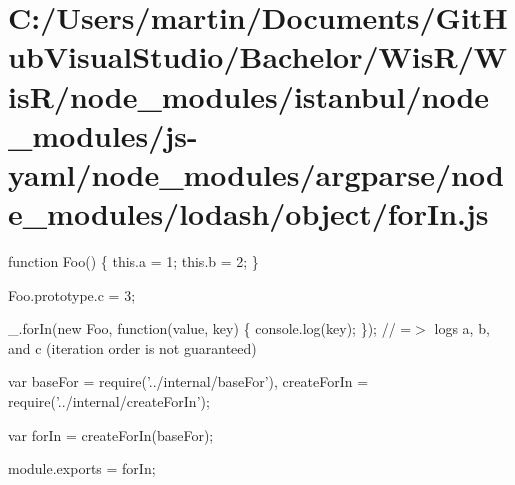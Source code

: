 \hypertarget{_c_1_2_users_2martin_2_documents_2_git_hub_visual_studio_2_bachelor_2_wis_r_2_wis_r_2node_module9ffc97169f0a15e2134f146445cd7404}{}\section{C\+:/\+Users/martin/\+Documents/\+Git\+Hub\+Visual\+Studio/\+Bachelor/\+Wis\+R/\+Wis\+R/node\+\_\+modules/istanbul/node\+\_\+modules/js-\/yaml/node\+\_\+modules/argparse/node\+\_\+modules/lodash/object/for\+In.\+js}
function Foo() \{ this.\+a = 1; this.\+b = 2; \}

Foo.\+prototype.\+c = 3;

\+\_\+.\+for\+In(new Foo, function(value, key) \{ console.\+log(key); \}); // =$>$ logs \textquotesingle{}a\textquotesingle{}, \textquotesingle{}b\textquotesingle{}, and \textquotesingle{}c\textquotesingle{} (iteration order is not guaranteed)


\begin{DoxyCodeInclude}
var baseFor = require(\textcolor{stringliteral}{'../internal/baseFor'}),
    createForIn = require(\textcolor{stringliteral}{'../internal/createForIn'});

var forIn = createForIn(baseFor);

module.exports = forIn;
\end{DoxyCodeInclude}
 